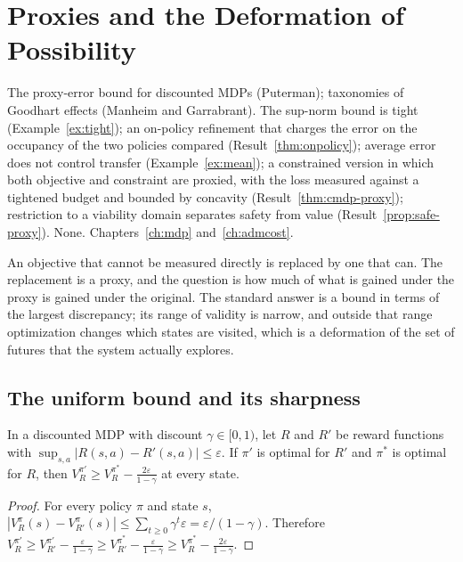 \chapter{Proxies and the Deformation of Possibility}\label{ch:proxies}
{The proxy-error bound for discounted MDPs (Puterman); taxonomies of Goodhart effects (Manheim and Garrabrant).}
{The sup-norm bound is tight (Example~\ref{ex:tight}); an on-policy refinement that charges the error on the occupancy of the two policies compared (Result~\ref{thm:onpolicy}); average error does not control transfer (Example~\ref{ex:mean}); a constrained version in which both objective and constraint are proxied, with the loss measured against a tightened budget and bounded by concavity (Result~\ref{thm:cmdp-proxy}); restriction to a viability domain separates safety from value (Result~\ref{prop:safe-proxy}).}
{None.}
{Chapters~\ref{ch:mdp} and~\ref{ch:admcost}.}

An objective that cannot be measured directly is replaced by one that can. The replacement is a proxy, and the question is how much of what is gained under the proxy is gained under the original. The standard answer is a bound in terms of the largest discrepancy; its range of validity is narrow, and outside that range optimization changes which states are visited, which is a deformation of the set of futures that the system actually explores.

\section{The uniform bound and its sharpness}

\begin{established}\label{prop:proxy}
In a discounted MDP with discount $\gamma\in[0,1)$, let $R$ and $R'$ be reward functions with $\sup_{s,a}|R(s,a)-R'(s,a)|\le\varepsilon$. If $\pi'$ is optimal for $R'$ and $\pi^{*}$ is optimal for $R$, then $V_R^{\pi'}\ge V_R^{\pi^{*}}-\tfrac{2\varepsilon}{1-\gamma}$ at every state.
\end{established}
\begin{proof}
For every policy $\pi$ and state $s$, $|V_R^{\pi}(s)-V_{R'}^{\pi}(s)|\le\sum_{t\ge0}\gamma^{t}\varepsilon=\varepsilon/(1-\gamma)$. Therefore $V_R^{\pi'}\ge V_{R'}^{\pi'}-\tfrac{\varepsilon}{1-\gamma}\ge V_{R'}^{\pi^{*}}-\tfrac{\varepsilon}{1-\gamma}\ge V_R^{\pi^{*}}-\tfrac{2\varepsilon}{1-\gamma}$.
\end{proof}

